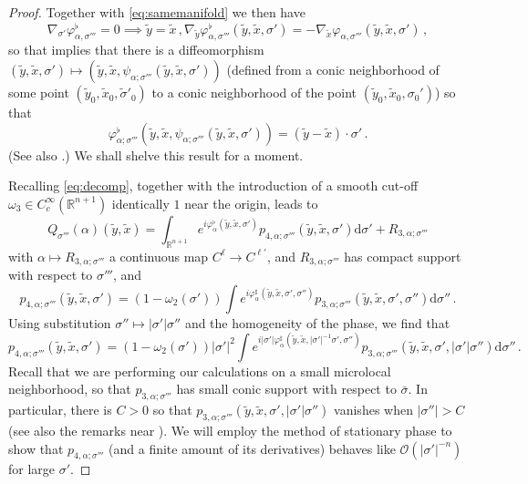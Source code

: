 \documentclass[11pt]{amsart}
\theoremstyle{definition}
\numberwithin{equation}{section}
\newcommand{\mR}{\mathbb{R}}                    %
\newcommand{\abs}[1]{\lvert #1 \rvert}          %
\newcommand{\dd}{\mathrm{d}}
\begin{document}
\begin{proof}
    Together with \eqref{eq:samemanifold} we then have
    \[
        \nabla_{\sigma'} \varphi_{\alpha,\sigma'''}^\flat=0\implies \tilde{y}=\tilde{x}\,, \nabla_{\tilde{y}}\varphi_{\alpha,\sigma'''}^\flat(\tilde{y},\tilde{x},\sigma') = -\nabla_{\tilde{x}}\varphi_{\alpha,\sigma'''}(\tilde{y},\tilde{x},\sigma')\,,
    \]
    so that \cite[Thm.~3.1.6]{FIO1} implies that there is a diffeomorphism $(\tilde{y},\tilde{x},\sigma')\mapsto(\tilde{y},\tilde{x},\psi_{\alpha;\sigma'''}(\tilde{y},\tilde{x},\sigma'))$ (defined from a conic neighborhood of some point $(\tilde{y}_0,\tilde{x}_0,\tilde{\sigma}'_0)$ to a conic neighborhood of the point $(\tilde{y}_0,\tilde{x}_0,\sigma_0')$) so that 
	\begin{equation}\label{eq:equivphase}
		\varphi_{\alpha;\sigma'''}^\flat(\tilde{y},\tilde{x},\psi_{\alpha;\sigma'''}(\tilde{y},\tilde{x},\sigma')) = (\tilde{y}-\tilde{x})\cdot \sigma'\,.
	\end{equation}
    (See also \cite[Def.~18.4.17]{MR4436039}.) We shall shelve this result for a moment.
    
	Recalling \eqref{eq:decomp}, together with the introduction of a smooth cut-off $\omega_3\in C_c^\infty(\mR^{n+1})$ identically $1$ near the origin, leads to
	\[
		Q_{\sigma'''}(\alpha)(\tilde{y},\tilde{x}) = \int_{\mR^{n+1}} e^{i\varphi_\alpha^\flat(\tilde{y},\tilde{x},\sigma')}  p_{4,\alpha;\sigma'''}(\tilde{y},\tilde{x},\sigma') \dd\sigma' + R_{3,\alpha;\sigma'''}
	\]
	with $\alpha\mapsto R_{3,\alpha;\sigma'''}$ a continuous map $C^{\ell}\to C^{\ell'}$, and $R_{3,\alpha;\sigma'''}$ has compact support with respect to $\sigma'''$, and
	\[
		p_{4,\alpha;\sigma'''}(\tilde{y},\tilde{x},\sigma') = (1-\omega_2(\sigma'))\int e^{i\varphi_\alpha^\sharp(\tilde{y},\tilde{x},\sigma', \sigma'')} p_{3,\alpha;\sigma'''}(\tilde{y},\tilde{x},\sigma', \sigma'')\dd\sigma''\,.
	\]
	Using substitution $\sigma'' \mapsto \abs{\sigma'}\sigma''$ and the homogeneity of the phase, we find that
	\begin{equation}\label{eq:p4}
		p_{4,\alpha;\sigma'''}(\tilde{y},\tilde{x},\sigma')=(1-\omega_2(\sigma'))\abs{\sigma'}^{2}\int e^{i\abs{\sigma'}\varphi_\alpha^\sharp(\tilde{y},\tilde{x},\abs{\sigma'}^{-1}\sigma', \sigma'')} p_{3,\alpha;\sigma'''}(\tilde{y},\tilde{x},\sigma', \abs{\sigma'}\sigma'')\dd\sigma''\,.
	\end{equation}
	Recall that we are performing our calculations on a small microlocal neighborhood, so that $p_{3,\alpha;\sigma'''}$ has small conic support with respect to $\bar\sigma$. In particular, there is $C>0$ so that $p_{3,\alpha;\sigma'''}(\tilde{y},\tilde{x},\sigma',\abs{\sigma'}\sigma'')$ vanishes when $\abs{\sigma''} > C$ (see also the remarks near \cite[Eq.~(3.2.4)]{FIO1}). We will employ the method of stationary phase to show that $p_{4,\alpha;\sigma'''}$ (and a finite amount of its derivatives) behaves like $\mathcal{O}(\abs{\sigma'}^{-n})$ for large $\sigma'$. 
    

\end{proof}
\end{document}
